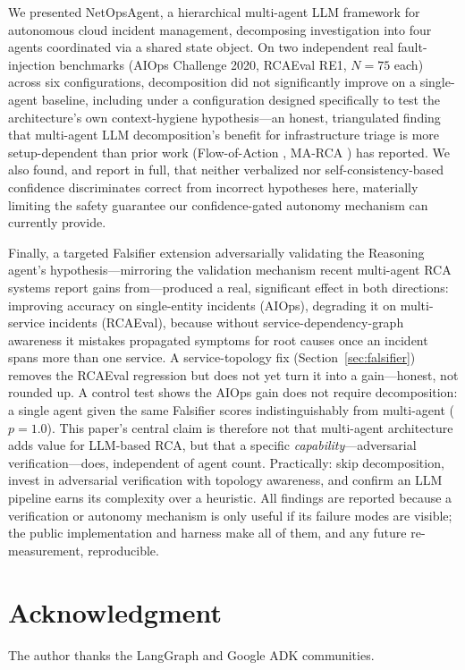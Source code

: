 \documentclass[10pt,conference]{IEEEtran}
\begin{document}
We presented NetOpsAgent, a hierarchical multi-agent LLM framework for
autonomous cloud incident management, decomposing investigation into four
agents coordinated via a shared state object. On two independent real
fault-injection benchmarks (AIOps Challenge 2020, RCAEval RE1, $N=75$ each)
across six configurations, decomposition did not significantly improve on
a single-agent baseline, including under a configuration designed
specifically to test the architecture's own context-hygiene hypothesis---an
honest, triangulated finding that multi-agent LLM decomposition's benefit
for infrastructure triage is more setup-dependent than prior work
(Flow-of-Action \cite{pei2025flowofaction}, MA-RCA \cite{fu2026marca}) has
reported. We also found, and report in full, that neither verbalized nor
self-consistency-based confidence discriminates correct from incorrect
hypotheses here, materially limiting the safety guarantee our
confidence-gated autonomy mechanism can currently provide.

Finally, a targeted Falsifier extension adversarially validating the
Reasoning agent's hypothesis---mirroring the validation mechanism recent
multi-agent RCA systems report gains from---produced a real, significant
effect in both directions: improving accuracy on single-entity incidents
(AIOps), degrading it on multi-service incidents (RCAEval), because
without service-dependency-graph awareness it mistakes propagated symptoms
for root causes once an incident spans more than one service. A
service-topology fix (Section~\ref{sec:falsifier}) removes the RCAEval
regression but does not yet turn it into a gain---honest, not rounded up.
A control test shows the AIOps gain does not require decomposition: a
single agent given the same Falsifier scores indistinguishably from
multi-agent ($p=1.0$). This
paper's central claim is therefore not that multi-agent architecture adds
value for LLM-based RCA, but that a specific \emph{capability}---adversarial
verification---does, independent of agent count. Practically: skip
decomposition, invest in adversarial verification with topology awareness,
and confirm an LLM pipeline earns its complexity over a heuristic. All findings are reported
because a verification or autonomy mechanism is only useful if its
failure modes are visible; the public implementation and harness make
all of them, and any future re-measurement, reproducible.

\section*{Acknowledgment}
The author thanks the LangGraph and Google ADK communities.
\end{document}
